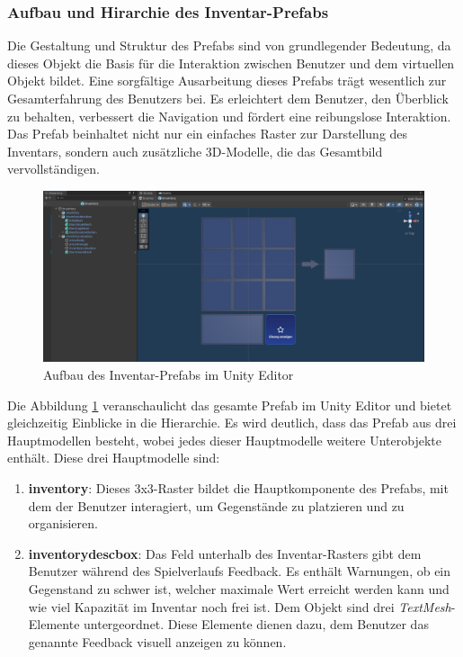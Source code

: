 \begin{itemize}
\subsubsection{Aufbau und Hirarchie des Inventar-Prefabs}
Die Gestaltung und Struktur des Prefabs sind von grundlegender Bedeutung, da dieses Objekt die Basis für die Interaktion
zwischen Benutzer und dem virtuellen Objekt bildet. Eine sorgfältige Ausarbeitung dieses Prefabs trägt wesentlich zur
Gesamterfahrung des Benutzers bei. Es erleichtert dem Benutzer, den Überblick zu behalten, verbessert die Navigation und
fördert eine reibungslose Interaktion. Das Prefab beinhaltet nicht nur ein einfaches Raster zur Darstellung des Inventars,
sondern auch zusätzliche 3D-Modelle, die das Gesamtbild vervollständigen.

\begin{figure}[H]
    \centering
    \includegraphics[scale=0.3]{images/invPrefabUnity}
    \caption{Aufbau des Inventar-Prefabs im Unity Editor}
    \label{fig:invPrefab_UNITY}
\end{figure}

Die Abbildung \ref{fig:invPrefab_UNITY} veranschaulicht das gesamte Prefab im Unity Editor und bietet gleichzeitig Einblicke
in die Hierarchie. Es wird deutlich, dass das Prefab aus drei Hauptmodellen besteht, wobei jedes dieser Hauptmodelle weitere
Unterobjekte enthält. Diese drei Hauptmodelle sind:
\begin{enumerate}
    \item \textbf{inventory}: Dieses 3x3-Raster bildet die Hauptkomponente des Prefabs, mit dem der Benutzer interagiert, um
    Gegenstände zu platzieren und zu organisieren.

    \item \textbf{inventorydescbox}: Das Feld unterhalb des Inventar-Rasters gibt dem Benutzer während des Spielverlaufs Feedback.
    Es enthält Warnungen, ob ein Gegenstand zu schwer ist, welcher maximale Wert erreicht werden kann und wie viel Kapazität
    im Inventar noch frei ist. Dem Objekt sind drei \textit{TextMesh}-Elemente untergeordnet. Diese Elemente dienen dazu,
    dem Benutzer das genannte Feedback visuell anzeigen zu können.


\end{enumerate}
\end{itemize}
